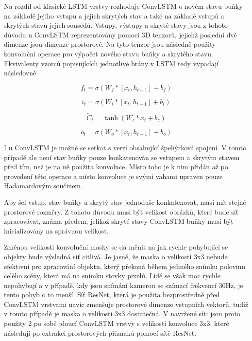 Na rozdíl od klasické LSTM vrstvy rozhoduje ConvLSTM o novém stavu buňky na základě jejího vstupu a jejích skrytých stav a také na základě vstupů a skrytých stavů jejích sousedů.
Vstupy, výstupy a skryté stavy jsou z tohoto důvodu u ConvLSTM reprezentovány pomocí 3D tenzorů, jejichž poslední dvě dimenze jsou dimenze prostorové.
Na tyto tenzor jsou následně použity konvoluční operace pro výpočet nového stavu buňky a skrytého stavu. Ekvivalenty vzorců popisujících jednotlivé brány v LSTM tedy vypadají následovně.

\begin{equation}
f_t = \sigma(W_{f} * [x_t, h_{t-1}] + b_f)
\label{eq:ConvLSTM_forget_gate}
\end{equation}

\begin{equation}
i_t = \sigma(W_{i} * [x_t, h_{t-1}] + b_i)
\label{eq:ConvLSTM_input_gate}
\end{equation}

\begin{equation}
\widetilde{C}_t = \tanh(W_{c} * x_t + b_c)
\label{eq:ConvLSTM_input_modulation_gate}
\end{equation}

\begin{equation}
o_t = \sigma(W_{o} * [x_t, h_{t-1}] + b_o)
\label{eq:ConvLSTM_output_gate}
\end{equation}

I u ConvLSTM je možné se setkat s verzí obsahující špehýrková spojení.
V tomto případě ale není stav buňky pouze konkatenován se vstupem a skrytým stavem před tím, než je na ně použita konvoluce.
Místo toho je k nim přidán až po provedení této operace a místo konvoluce je svými vahami upraven pouze Hadamardovým součinem.

Aby šel vstup, stav buňky a skrytý stav jednoduše konkatenovat, musí mít stejné prostorové rozměry.
Z tohoto důvodu musí být velikost obrázků, které bude síť zpracovávat, známa předem, jelikož skryté stavy ConvLSTM buňky musí být inicializovány na správnou velikost.

Změnou velikosti konvoluční masky se dá měnit na jak rychle pohybující se objekty bude výsledná síť citlivá.
Je jasné, že maska o velikosti 3x3 nebude efektivní pro zpracování objektu, který překoná během jediného snímku polovinu celého scény, která má na snímku stovky pixelů.
Lidé se však moc rychle nepohybují a v případě, kdy jsou snímání kamerou se snímací frekvencí 30Hz, je tento pohyb o to menší. Síť ResNet, která je použita bezprostředně před ConvLSTM vrstvami navíc zmenšuje prostorové dimenze vstupních vektorů, tudíž v tomto případě je maska o velikosti 3x3 dostatečná.
V navržené síti jsou proto použity 2 po sobě jdoucí ConvLSTM vrstvy s velikostí konvoluce 3x3, které následují po extrakci prostorových příznaků pomocí sítě ResNet.

\endinput